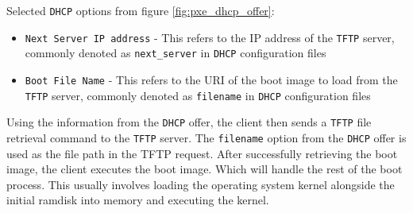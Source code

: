 \documentclass[../main.tex]{subfiles}
\begin{document}
Selected \texttt{DHCP} options from figure \ref{fig:pxe_dhcp_offer}:

\begin{itemize}
  \item \texttt{Next Server IP address} - This refers to the IP address of the \texttt{TFTP} server, commonly denoted as \texttt{next\_server} in \texttt{DHCP} configuration files
  \item \texttt{Boot File Name} - This refers to the URI of the boot image to load from the \texttt{TFTP} server, commonly denoted as \texttt{filename} in \texttt{DHCP} configuration files
\end{itemize}

Using the information from the \texttt{DHCP} offer, the client then sends a \texttt{TFTP} file retrieval command to the \texttt{TFTP} server.
The \texttt{filename} option from the \texttt{DHCP} offer is used as the file path in the TFTP request.
After successfully retrieving the boot image, the client executes the boot image. Which will handle the rest of the boot process.
This usually involves loading the operating system kernel alongside the initial ramdisk into memory and executing the kernel.
\end{document}
